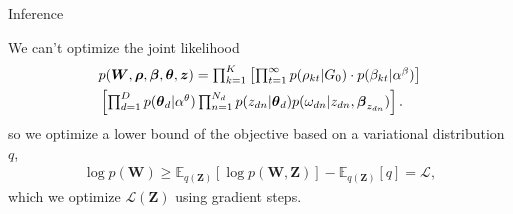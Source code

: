 \documentclass[compress]{beamer}
\newcommand{\e}[2]{\mathbb{E}_{#1}\left[ #2 \right] }
\newcommand{\elbo}{\mathcal{L}}
\begin{document}
\begin{frame}{Inference}

We can't optimize the joint likelihood
\begin{align}
& \textstyle p( \boldsymbol{W}, \boldsymbol{\rho}, \boldsymbol{\beta},
\boldsymbol{\theta}, \boldsymbol{z} ) = \prod_{k=1}^K
\left[ \prod_{t=1}^{\infty} p( \rho_{kt} | G_0 ) \cdot p( \beta_{kt}
| \alpha^{\beta} ) \right] \notag \\
& \textstyle \left[ \prod_{d=1}^{D} p( \boldsymbol{\theta}_d | \alpha^{\theta} )
\prod_{n=1}^{N_d} p( z_{dn} | \boldsymbol{\theta}_d ) p( \omega_{dn} |
z_{dn}, \boldsymbol{\beta}_{z_{dn}} ) \right] . \notag
\end{align}
\pause
so we optimize a lower bound of the objective based on a variational distribution $q$,
\begin{align}
\textstyle \log p(\boldsymbol{W}) \geq {\e{q(\boldsymbol{Z})}{\log p(\boldsymbol{W},\boldsymbol{Z})} - \e{q(\boldsymbol{Z})}{q}} = \elbo,
\label{eq:elbo-vague}
\end{align}
which we optimize $\elbo(\boldsymbol{Z})$ using gradient steps.
\end{frame}
\end{document}

